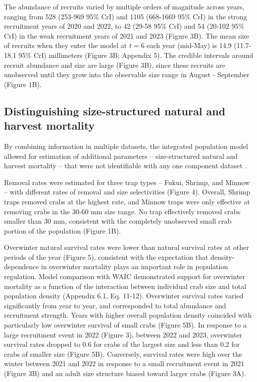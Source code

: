 \documentclass{article}
\begin{document}
The abundance of recruits varied by multiple orders of magnitude across years, ranging from 528 (253-969 95\% CrI) and 1105 (668-1669 95\% CrI) in the strong recruitment years of 2020 and 2022, to 42 (29-58 95\% CrI) and 54 (20-102 95\% CrI) in the weak recruitment years of 2021 and 2023 (Figure 3B). The mean size of recruits when they enter the model at $t = 6$ each year (mid-May) is 14.9 (11.7-18.1 95\% CrI) millimeters (Figure 3B; Appendix 5). The credible intervals around recruit abundance and size are large (Figure 3B), since these recruits are unobserved until they grow into the observable size range in August - September (Figure 1B).

\subsection{Distinguishing size-structured natural and harvest mortality}

By combining information in multiple datasets, the integrated population model allowed for estimation of additional parameters -- size-structured natural and harvest mortality -- that were not identifiable with any one component dataset \parencite{riecke2019integrated}.

Removal rates were estimated for three trap types -- Fukui, Shrimp, and Minnow -- with different rates of removal and size selectivities (Figure 4). Overall, Shrimp traps removed crabs at the highest rate, and Minnow traps were only effective at removing crabs in the 30-60 mm size range. No trap effectively removed crabs smaller than 30 mm, consistent with the completely unobserved small crab portion of the population (Figure 1B).

Overwinter natural survival rates were lower than natural survival rates at other periods of the year (Figure 5), consistent with the expectation that density-dependence in overwinter mortality plays an important role in population regulation. Model comparison with WAIC demonstrated support for overwinter mortality as a function of the interaction between individual crab size and total population density (Appendix 6.1, Eq. 11-12). Overwinter survival rates varied significantly from year to year, and corresponded to total abundance and recruitment strength. Years with higher overall population density coincided with particularly low overwinter survival of small crabs (Figure 5B). In response to a large recruitment event in 2022 (Figure 3), between 2022 and 2023, overwinter survival rates dropped to 0.6 for crabs of the largest size and less than 0.2 for crabs of smaller size (Figure 5B). Conversely, survival rates were high over the winter between 2021 and 2022 in response to a small recruitment event in 2021 (Figure 3B) and an adult size structure biased toward larger crabs (Figure 3A). 
\end{document}
